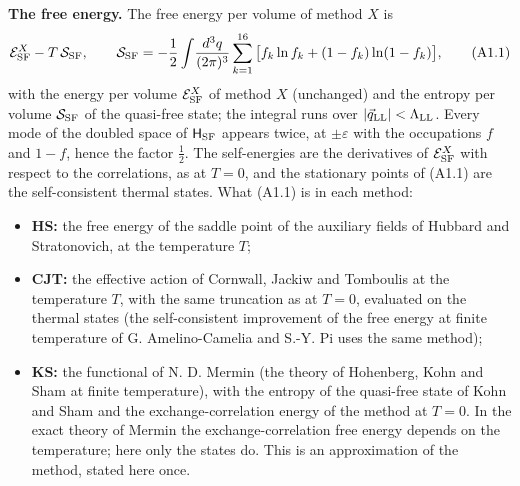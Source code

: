 \documentclass[
  10pt,
]{article}
\providecommand{\tightlist}{%
  \setlength{\itemsep}{0pt}\setlength{\parskip}{0pt}}
\begin{document}
\textbf{The free energy.} The free energy per volume of method \(X\) is
\[\mathcal E^X_{\rm SF}-T\,\mathcal S_{\rm SF},\qquad\mathcal S_{\rm SF}=-\frac12\int\!\frac{d^3q}{(2\pi)^3}\sum_{k=1}^{16}\big[f_k\ln f_k+(1-f_k)\ln(1-f_k)\big],\tag{A1.1}\]
with the energy per volume \(\mathcal E^X_{\rm SF}\) of method \(X\)
(unchanged) and the entropy per volume \(\mathcal S_{\rm SF}\) of the
quasi-free state; the integral runs over
\(\lvert\vec q_{\rm LL}\rvert<\Lambda_{\rm LL}\). Every mode of the
doubled space of \(\mathsf H_{\rm SF}\) appears twice, at
\(\pm\varepsilon\) with the occupations \(f\) and \(1-f\), hence the
factor \(\tfrac12\). The self-energies are the derivatives of
\(\mathcal E^X_{\rm SF}\) with respect to the correlations, as at
\(T=0\), and the stationary points of (A1.1) are the self-consistent
thermal states. What (A1.1) is in each method:

\begin{itemize}
\tightlist
\item
  \textbf{HS:} the free energy of the saddle point of the auxiliary
  fields of Hubbard and Stratonovich, at the temperature \(T\);
\item
  \textbf{CJT:} the effective action of Cornwall, Jackiw and Tomboulis
  at the temperature \(T\), with the same truncation as at \(T=0\),
  evaluated on the thermal states (the self-consistent improvement of
  the free energy at finite temperature of G. Amelino-Camelia and S.-Y.
  Pi uses the same method);
\item
  \textbf{KS:} the functional of N. D. Mermin (the theory of Hohenberg,
  Kohn and Sham at finite temperature), with the entropy of the
  quasi-free state of Kohn and Sham and the exchange-correlation energy
  of the method at \(T=0\). In the exact theory of Mermin the
  exchange-correlation free energy depends on the temperature; here only
  the states do. This is an approximation of the method, stated here
  once.
\end{itemize}
\end{document}
